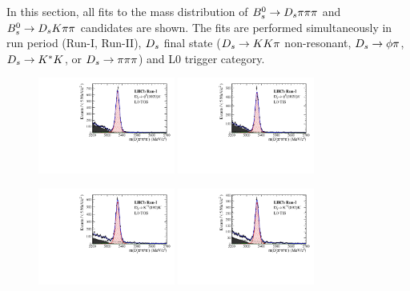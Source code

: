 \setcounter{figure}{0}
\setcounter{table}{0}

\renewcommand{\thefigure}{B.\arabic{figure}}

In this section, all fits to the mass distribution of ${{B}^0_{s}}\rightarrow{\ensuremath{{D}_{s}}}{\ensuremath{\pi}}{\ensuremath{\pi}}{\ensuremath{\pi}}$ and ${{B}^0_{s}}\rightarrow{\ensuremath{{D}_{s}}}{\ensuremath{K}}{\ensuremath{\pi}}{\ensuremath{\pi}}$ candidates are shown. 
The fits are performed simultaneously 
in run period (Run-I, Run-II), 
${{D}_{s}}$ final state  (${{D}_{s}}\rightarrow{\ensuremath{K}}{\ensuremath{K}}{\ensuremath{\pi}}$ non-resonant, ${{D}_{s}}\rightarrow\phi\pi$, ${{D}_{s}}\rightarrow{\ensuremath{{K}^*}}{\ensuremath{K}}$, or ${{D}_{s}}\rightarrow{\ensuremath{\pi}}{\ensuremath{\pi}}{\ensuremath{\pi}}$) 
and \textsf{L0} trigger category. 

\begin{figure}[h]
\centering
\includegraphics[height=!,width=0.4\textwidth]{figs/MassFit/norm_Run1_phipi_t0.pdf}
\includegraphics[height=!,width=0.4\textwidth]{figs/MassFit/norm_Run1_phipi_t1.pdf}

\includegraphics[height=!,width=0.4\textwidth]{figs/MassFit/norm_Run1_KsK_t0.pdf}
\includegraphics[height=!,width=0.4\textwidth]{figs/MassFit/norm_Run1_KsK_t1.pdf}


\end{figure}
